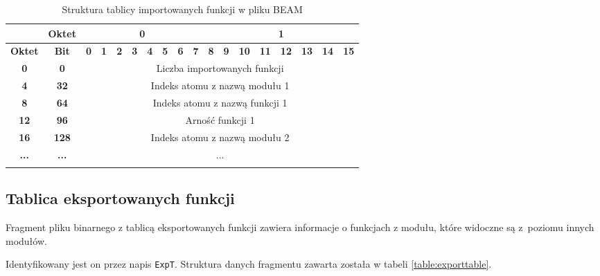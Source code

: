 \begin{longtable}{|c|c|c|c|c|c|c|c|c|c|c|c|c|c|c|c|c|c|}
\hline
         & \textbf{Oktet} & \multicolumn{8}{|c|}{\textbf{0}} & \multicolumn{8}{|c|}{\textbf{1}} \\
\hline
\textbf{Oktet} & \textbf{Bit} & \textbf{0} & \textbf{1} & \textbf{2} & \textbf{3} & \textbf{4} & \textbf{5} & \textbf{6} & \textbf{7} & \textbf{8} & \textbf{9} & \textbf{10} & \textbf{11} & \textbf{12} & \textbf{13} & \textbf{14} & \textbf{15}\\
\hline
\textbf{0} & \textbf{0} & \multicolumn{16}{|c|}{Liczba importowanych funkcji} \\[3ex]
\hline
\textbf{4} & \textbf{32} & \multicolumn{16}{|c|}{Indeks atomu z nazwą modułu 1}\\[3ex]
\hline
\textbf{8} & \textbf{64} & \multicolumn{16}{|c|}{Indeks atomu z nazwą funkcji 1} \\[3ex]
\hline
\textbf{12} & \textbf{96} & \multicolumn{16}{|c|}{Arność funkcji 1}\\[3ex]
\hline
\textbf{16} & \textbf{128} & \multicolumn{16}{|c|}{Indeks atomu z nazwą modułu 2}\\[3ex]
\hline
\textbf{...} & \textbf{...} & \multicolumn{16}{|c|}{...}  \\[3ex]
\hline
\caption{Struktura tablicy importowanych funkcji w pliku BEAM}
\label{table:importtable} \\
\end{longtable}

\subsection{Tablica eksportowanych funkcji}
Fragment pliku binarnego z tablicą eksportowanych funkcji zawiera informacje o funkcjach z modułu, które widoczne są z~poziomu innych modułów.

Identyfikowany jest on przez napis \texttt{ExpT}. Struktura danych fragmentu zawarta została w tabeli \ref{table:exporttable}.

